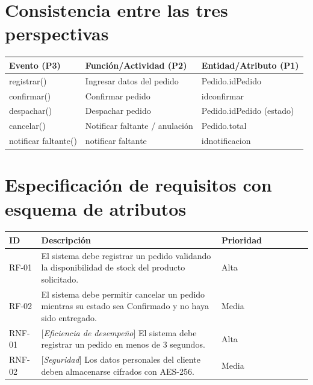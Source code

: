 \documentclass[11pt,a4paper]{article}
\begin{document}
\section{Consistencia entre las tres perspectivas}


\begin{table}[h]
\centering
\begin{tabular}{lll}
\toprule
\textbf{Evento (P3)} & \textbf{Funci\'on/Actividad (P2)} & \textbf{Entidad/Atributo (P1)} \\
\midrule
registrar() & Ingresar datos del pedido & Pedido.idPedido \\

confirmar() & Confirmar pedido & idconfirmar\\

despachar() & Despachar pedido & Pedido.idPedido (estado) \\
cancelar() & Notificar faltante / anulaci\'on & Pedido.total \\
notificar faltante() & notificar faltante & idnotificacion \\
\bottomrule
\end{tabular}

\end{table}



\section{Especificaci\'on de requisitos con esquema de atributos}


\begin{table}[H]
\centering
\small
\begin{tabular}{p{1.7cm}p{6.3cm}p{1.5cm}p{1.4cm}p{1.7cm}p{1cm}p{1cm}p{2.2cm}}
\toprule
\textbf{ID} & \textbf{Descripci\'on} & \textbf{Prioridad} \\
\midrule
RF-01 & El sistema debe registrar un pedido validando la disponibilidad de stock del producto solicitado. & Alta  \\
RF-02 & El sistema debe permitir cancelar un pedido mientras su estado sea Confirmado y no haya sido entregado. & Media \\
RNF-01 & [\emph{Eficiencia de desempe\~no}] El sistema debe registrar un pedido en menos de 3 segundos. & Alta \\
RNF-02 & [\emph{Seguridad}] Los datos personales del cliente deben almacenarse cifrados con AES-256. & Media \\
\bottomrule
\end{tabular}

\end{table}
\end{document}
